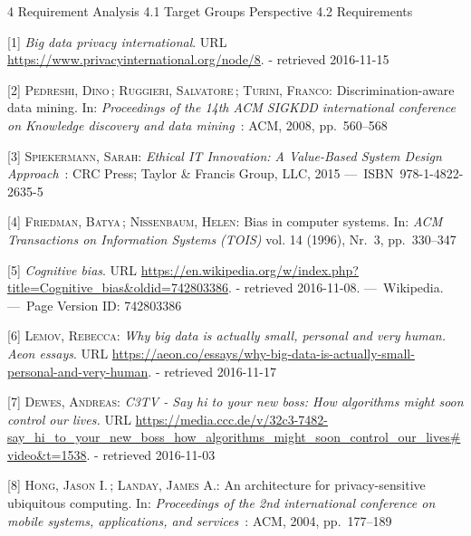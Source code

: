 \documentclass[12pt,english,a4paper,titlepage,cleardoublepage=empty,dottedtoc]{report}
\begin{document}
4 Requirement Analysis 4.1 Target Groups Perspective 4.2 Requirements

\hypertarget{refs}{}
\hypertarget{ref-web_2016_privacy-international-about-big-data}{}
{[}1{]} \emph{Big data privacy international}. URL
\url{https://www.privacyinternational.org/node/8}. - retrieved
2016-11-15

\hypertarget{ref-paper_2008_discrimination-aware-data-mining}{}
{[}2{]} \textsc{Pedreshi, Dino}\,; \textsc{Ruggieri, Salvatore}\,;
\textsc{Turini, Franco}: Discrimination-aware data mining. In:
\emph{Proceedings of the 14th ACM SIGKDD international conference on
Knowledge discovery and data mining}~: ACM, 2008, pp.~560--568

\hypertarget{ref-book_2015_ethical-it-innovation}{}
{[}3{]} \textsc{Spiekermann, Sarah}: \emph{Ethical IT Innovation: A
Value-Based System Design Approach}~: CRC Press; Taylor \& Francis
Group, LLC, 2015 ---~ISBN~978-1-4822-2635-5

\hypertarget{ref-paper_1996_bias-in-computer-systems}{}
{[}4{]} \textsc{Friedman, Batya}\,; \textsc{Nissenbaum, Helen}: Bias in
computer systems. In: \emph{ACM Transactions on Information Systems
(TOIS)} vol. 14 (1996), Nr.~3, pp.~330--347

\hypertarget{ref-wikipedia_2016_cognitive-bias}{}
{[}5{]} \emph{Cognitive bias}. URL
\url{https://en.wikipedia.org/w/index.php?title=Cognitive_bias\&oldid=742803386}.
- retrieved 2016-11-08. ---~Wikipedia. ---~Page Version ID: 742803386

\hypertarget{ref-web_2016_big-data-is-people}{}
{[}6{]} \textsc{Lemov, Rebecca}: \emph{Why big data is actually small,
personal and very human. Aeon essays}. URL
\url{https://aeon.co/essays/why-big-data-is-actually-small-personal-and-very-human}.
- retrieved 2016-11-17

\hypertarget{ref-video_2015_big-data-and-deep-learning_discrimination}{}
{[}7{]} \textsc{Dewes, Andreas}: \emph{C3TV - Say hi to your new boss:
How algorithms might soon control our lives.} URL
\url{https://media.ccc.de/v/32c3-7482-say_hi_to_your_new_boss_how_algorithms_might_soon_control_our_lives\#video\&t=1538}.
- retrieved 2016-11-03

\hypertarget{ref-study_2004_architecture-for-privacy-sensitive-ubiquitous-computing}{}
{[}8{]} \textsc{Hong, Jason I.}\,; \textsc{Landay, James A.}: An
architecture for privacy-sensitive ubiquitous computing. In:
\emph{Proceedings of the 2nd international conference on mobile systems,
applications, and services}~: ACM, 2004, pp.~177--189
\end{document}

